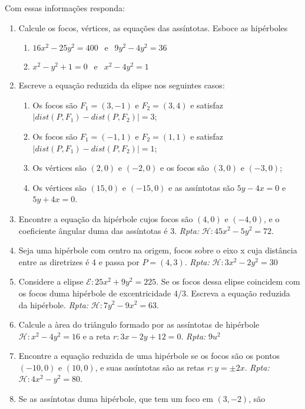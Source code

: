 \documentclass{article}
\begin{document}
 Com essas informações responda:
 \begin{enumerate}
     \item Calcule os focos, vértices, as equações das assíntotas. Esboce as hipérboles
       \begin{enumerate}
       \item $16x^2-25y^2=400  \ \  \text{ e } \ \ 9y^2-4y^2=36$
       \item $x^2-y^2+1=0  \ \ \text{ e } \ \ x^2-4y^2=1$ 
       \end{enumerate}
    \item Escreve a equação reduzida da elipse nos seguintes casos:
     \begin{enumerate}
     \item Os focos são $F_1=(3,-1)$ e $F_2=(3,4)$
     e satisfaz $|dist(P,F_1)-dist(P,F_2)|=3$;
     \item Os focos são $F_1=(-1,1)$ e $F_2=(1,1)$
     e satisfaz $|dist(P,F_1)-dist(P,F_2)|=1$;
     \item Os vértices são 
     $(2,0)$ e $(-2,0)$ e os focos são 
     $(3,0)$ e $(-3,0)$;
     \item Os vértices são 
     $(15,0)$ e $(-15,0)$ e as assíntotas são 
     $5y-4x=0$ e $5y+4x=0$.
     \end{enumerate} 
    \item Encontre a equação da hipérbole cujos focos 
    são $(4,0)$ e $(-4,0)$, e o coeficiente ângular duma das assíntotas 
    é 3. {\it Rpta: } $\mathcal{H}: 45x^2-5y^2=72$.
    \item Seja uma hipérbole com centro na origem, focos sobre o eixo x cuja distância entre as diretrizes é 4 e passa por $P=(4,3)$.
    {\it Rpta: } $\mathcal{H}: 3x^2-2y^2=30$
    \item Considere a elipse $\mathcal{E}: 25x^2+9y^2=225$. 
    Se os focos dessa elipse coincidem 
    com os focos duma hipérbole de excentricidade 4/3.
    Escreva a equação reduzida da hipérbole.
    {\it Rpta: } $\mathcal{H}: 7y^2-9x^2=63$.
    \item Calcule a àrea do triângulo formado por as assíntotas de 
    hipérbole $\mathcal{H}: x^2-4y^2=16$ e  a reta 
    $r: 3x-2y+12=0$. {\it Rpta: } $9 u^2$
    \item Encontre a equação reduzida de uma hipérbole se os focos são 
    os pontos $(-10,0)$ e $(10,0)$, e suas assíntotas são as retas 
    $r: y=\pm 2x$. {\it Rpta: } $\mathcal{H}: 4x^2-y^2=80$.
    \item Se as assíntotas duma hipérbole, 
    que tem um foco em $(3,-2)$, são 

\end{enumerate}
\end{document}
